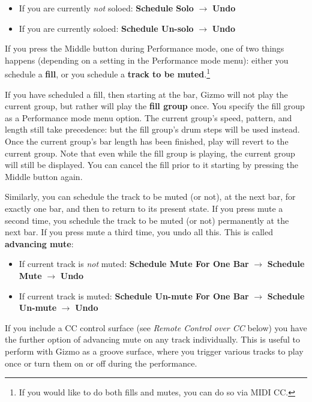 \documentclass{article}
\begin{document}
\begin{itemize}
\item If you are currently {\it not} soloed: {\bf Schedule Solo} \(\rightarrow\) {\bf Undo}
\item If you are currently soloed: {\bf Schedule Un-solo} \(\rightarrow\) {\bf Undo}
\end{itemize}

If you press the Middle button during Performance mode, one of two things happens (depending on a setting in the Performance mode menu): either you schedule a {\bf fill}, or you schedule a {\bf track to be muted}.\footnote{If you would like to do both fills and mutes, you can do so via MIDI CC.}

If you have scheduled a fill, then starting at the bar, Gizmo will not play the current group, but rather will play the {\bf fill group} once.  You specify the fill group as a Performance mode menu option.  The current group's speed, pattern, and length still take precedence: but the fill group's drum steps will be used instead.  Once the current group's bar length has been finished, play will revert to the current group.  Note that even while the fill group is playing, the current group will still be displayed. You can cancel the fill prior to it starting by pressing the Middle button again.  

Similarly, you can schedule the track to be muted (or not), at the next bar, for exactly one bar, and then to return to its present state.  If you press mute a second time, you schedule the track to be muted (or not) permanently at the next bar.  If you press mute a third time, you undo all this.  This is called {\bf advancing mute}:

\begin{itemize}
\item If current track is {\it not} muted: {\bf Schedule Mute For One Bar} \(\rightarrow\)  {\bf Schedule Mute} \(\rightarrow\) {\bf Undo}
\item If current track is muted: {\bf Schedule Un-mute For One Bar} \(\rightarrow\)  {\bf Schedule Un-mute} \(\rightarrow\) {\bf Undo}
\end{itemize}

If you include a CC control surface (see {\it Remote Control over CC} below) you have the further option of advancing mute on any track individually.  This is useful to perform with Gizmo as a groove surface, where you trigger various tracks to play once or turn them on or off during the performance.
\end{document}
